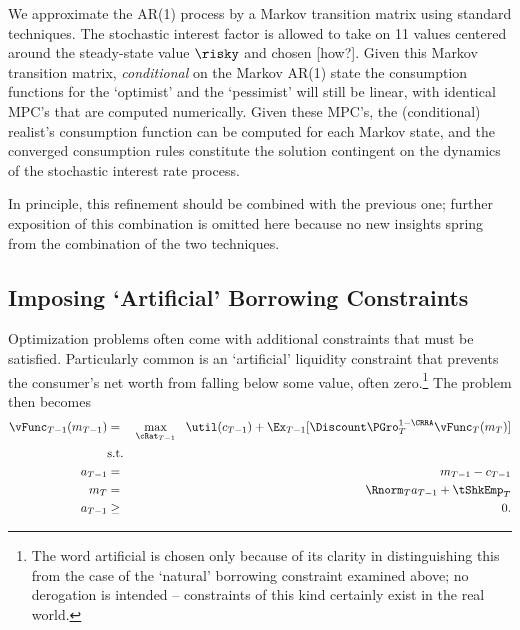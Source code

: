 \documentclass[titlepage]{\econtex}
\begin{document}

We approximate the AR(1) process by a Markov transition matrix using standard techniques.  The stochastic interest factor is allowed to take 
on 11 values centered around the steady-state value $\risky$ and chosen [how?].  Given this Markov transition matrix,
\textit{conditional} on the Markov AR(1) state the consumption functions for the `optimist' and the `pessimist' will still be linear, 
with identical MPC's that are computed numerically.  Given these MPC's, the (conditional) realist's consumption function can be computed for each Markov state, and the converged consumption rules constitute the solution contingent on the dynamics of the stochastic
interest rate process.  

In principle, this refinement should be combined with the previous one;
further exposition of this combination is omitted here because no new
insights spring from the combination of the two techniques.



\hypertarget{Imposing-Artificial-Borrowing-Constraints}{}
\subsection{Imposing `Artificial' Borrowing Constraints}

Optimization problems often come with additional constraints that must
be satisfied.  Particularly common is an `artificial' liquidity constraint that
prevents the consumer's net worth from falling below some value, often
zero.\footnote{The word artificial is chosen only because of its clarity in distinguishing
this from the case of the `natural' borrowing constraint examined above; no derogation is
intended -- constraints of this kind certainly exist in the real world.}  The problem then becomes
\begin{eqnarray*}
{\vFunc}_{T-1}({m}_{T-1}) & = & \max_{\cRat_{T-1}} ~~ \util({c}_{T-1}) + \Ex_{T-1} [\Discount \PGro_{T}^{1-\CRRA}{\vFunc}_{T}({m}_{T})] \label{eq:ConstrArt}
\\ & \mbox{s.t.}&  \nonumber
\\ {a}_{T-1} & = & {m}_{T-1} - {c}_{T-1}
\\ {m}_{T} & = & \Rnorm_{T} {a}_{T-1} + \tShkEmp_{T}
\\ {a}_{T-1} & \geq & 0 .
\end{eqnarray*}
\end{document}
